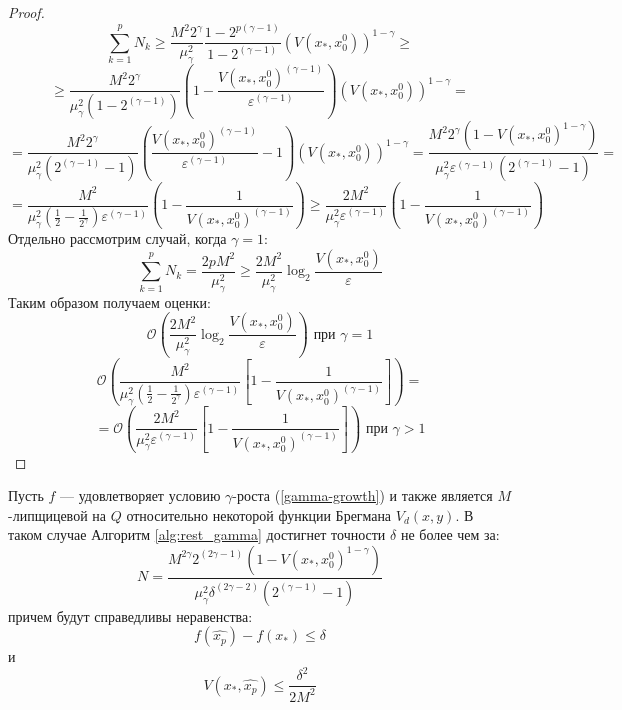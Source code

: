 \begin{proof}
       $$
           \sum_{k=1}^{p} N_k \geq \frac{M^2 2^{\gamma}}{\mu_{\gamma}^2} \frac{1 - 2^{p(\gamma-1)}}{1 - 2^{(\gamma-1)}} (V(x_*, x_0^0))^{1 - \gamma} \geq 
       $$
       $$
           \geq \frac{M^2 2^{\gamma}}{\mu_{\gamma}^2 (1 - 2^{(\gamma-1)})} (1 - \frac{V(x_*, x_0^0)^{(\gamma-1)}}{\varepsilon^{(\gamma-1)}}) (V(x_*, x_0^0))^{1 - \gamma} =
       $$
       $$
           = \frac{M^2 2^{\gamma}}{\mu_{\gamma}^2 (2^{(\gamma-1)} - 1)} (\frac{V(x_*, x_0^0)^{(\gamma-1)}}{\varepsilon^{(\gamma-1)}} - 1) (V(x_*, x_0^0))^{1 - \gamma} = \frac{M^2 2^{\gamma}(1 - V(x_*, x_0^0)^{1 - \gamma}) }{\mu_{\gamma}^2 \varepsilon^{(\gamma-1)} (2^{(\gamma-1)} - 1)} = 
       $$
       $$
           = \frac{M^2}{\mu_{\gamma}^2 (\frac{1}{2} - \frac{1}{2^\gamma}) \varepsilon^{(\gamma-1)} } (1 - \frac{1} {V(x_*, x_0^0)^{(\gamma - 1)}}) \geq \frac{2 M^2}{\mu_{\gamma}^2 \varepsilon^{(\gamma-1)} } (1 - \frac{1} {V(x_*, x_0^0)^{(\gamma - 1)}}) 
       $$
       Отдельно рассмотрим случай, когда $\gamma = 1$:
       $$
           \sum_{k=1}^{p} N_k = \frac{2 p M^2}{\mu_{\gamma}^2} \geq \frac{2 M^2}{\mu_{\gamma}^2} \log_2{\frac{V(x_*, x_0^0)}{\varepsilon}}
       $$
       Таким образом получаем оценки:
       $$
           \mathcal{O} \left(\frac{2 M^2}{\mu_{\gamma}^2} \log_2{\frac{V(x_*, x_0^0)}{\varepsilon}}\right) \text{ при } \gamma = 1
       $$
       $$
           \mathcal{O} \left(\frac{M^2}{\mu_{\gamma}^2 \left(\frac{1}{2} - \frac{1}{2^\gamma}\right) \varepsilon^{(\gamma-1)} } \left[1 - \frac{1} {V(x_*, x_0^0)^{(\gamma - 1)}}\right]\right) =
       $$
       $$
           = \mathcal{O} \left(\frac{2 M^2}{\mu_{\gamma}^2 \varepsilon^{(\gamma-1)} } \left[1 - \frac{1} {V(x_*, x_0^0)^{(\gamma - 1)}}\right]\right) \text{ при } \gamma > 1
       $$
    \end{proof}
    \begin{theorem}
        Пусть $f$ --- удовлетворяет условию $\gamma$-роста (\ref{gamma-growth}) и также является $M$-липщицевой на $Q$ относительно некоторой функции Брегмана $V_d(x, y)$. В таком случае Алгоритм \ref{alg:rest_gamma} достигнет точности $\delta$ не более чем за:
        \begin{equation}
           N = \frac{M^{2\gamma} 2^{(2\gamma - 1)}(1 - V(x_*, x_0^0)^{1 - \gamma}) }{\mu_{\gamma}^2 \delta^{(2\gamma - 2)} (2^{(\gamma-1)} - 1)}
        \end{equation}
        причем будут справедливы неравенства:
        \begin{equation}
           f(\widehat{x_p}) - f(x_*)  \leq \delta 
        \end{equation}
        и
        \begin{equation}
           V(x_*, \widehat{x_p}) \leq \frac{\delta^2}{2 M^2}
        \end{equation}
    \end{theorem}

